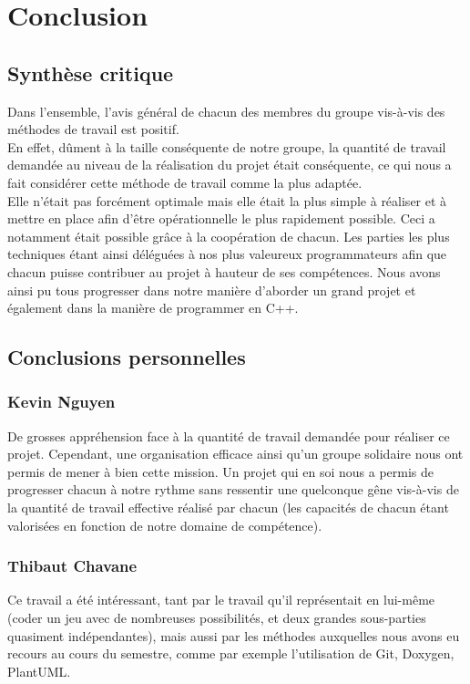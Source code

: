 \chapter{Conclusion}
    \section{Synthèse critique}
        Dans l'ensemble, l'avis général de chacun des membres du groupe vis-à-vis des méthodes de travail est positif.\\

        En effet, dûment à la taille conséquente de notre groupe, la quantité de travail demandée au niveau de la réalisation du projet était conséquente, ce qui nous a fait considérer cette méthode de travail comme la plus adaptée.\\

        Elle n'était pas forcément optimale mais elle était la plus simple à réaliser et à mettre en place afin d'être opérationnelle le plus rapidement possible. Ceci a notamment était possible grâce à la coopération de chacun. Les parties les plus techniques étant ainsi déléguées à nos plus valeureux programmateurs afin que chacun puisse contribuer au projet à hauteur de ses compétences. Nous avons ainsi pu tous progresser dans notre manière d'aborder un grand projet et également dans la manière de programmer en C++.\\

    \section{Conclusions personnelles}
        \subsection{Kevin Nguyen}
            De grosses appréhension face à la quantité de travail demandée pour réaliser ce projet. Cependant, une organisation efficace ainsi qu'un groupe solidaire nous ont permis de mener à bien cette mission. Un projet qui en soi nous a permis de progresser chacun à notre rythme sans ressentir une quelconque gêne vis-à-vis de la quantité de travail effective réalisé par chacun (les capacités de chacun étant valorisées en fonction de notre domaine de compétence).
        \subsection{Thibaut Chavane}
            Ce travail a été intéressant, tant par le travail qu'il représentait en lui-même (coder un jeu avec de nombreuses possibilités, et deux grandes sous-parties quasiment indépendantes), mais aussi par les méthodes auxquelles nous avons eu recours au cours du semestre, comme par exemple l'utilisation de Git, Doxygen, PlantUML. \\

